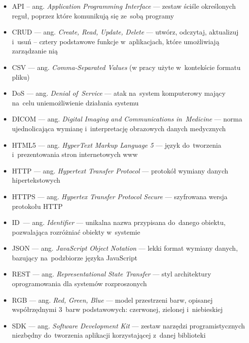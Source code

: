\documentclass[a4paper,11pt,twoside,openright]{report}
\theoremstyle{definition}
\begin{document}
\begin{itemize}[noitemsep]
\item API -- ang. \textit{Application Programming Interface} --- zestaw ściśle określonych reguł, poprzez które komunikują się ze~sobą programy\\
\item CRUD --- ang. \textit{Create, Read, Update, Delete} --- utwórz, odczytaj, aktualizuj i~usuń -- cztery podstawowe funkcje w~aplikacjach, które umożliwiają zarządzanie nią\\
\item CSV --- ang. \textit{Comma-Separated Values} (w pracy użyte w~kontekście formatu pliku) \\
\item DoS --- ang. \textit{Denial of~Service} --- atak na~system komputerowy mający na~celu uniemożliwienie działania systemu\\
\item DICOM --- ang. \textit{Digital Imaging and Communications in~Medicine} --- norma ujednolicająca wymianę i~interpretację obrazowych danych medycznych\\
\item HTML5 --- ang. \textit{HyperText Markup Language 5} --- język do~tworzenia i~prezentowania stron internetowych www\\
\item HTTP --- ang. \textit{Hypertext Transfer Protocol} --- protokół wymiany danych hipertekstowych\\
\item HTTPS --- ang. \textit{Hypertex Transfer Protocol Secure} --- szyfrowana wersja protokołu HTTP\\
\item ID~--- ang. \textit{Identifier} --- unikalna nazwa przypisana do~danego obiektu, pozwalająca rozróżniać obiekty w~systemie\\
\item JSON --- ang. \textit{JavaScript Object Notation} --- lekki format wymiany danych, bazujący na~podzbiorze języka JavaScript\\
\item REST --- ang. \textit{Representational State Transfer} --- styl architektury oprogramowania dla systemów rozproszonych\\
\item RGB --- ang. \textit{Red, Green, Blue} --- model przestrzeni barw, opisanej współrzędnymi 3~barw podstawowych: czerwonej, zielonej i~niebieskiej\\
\item SDK --- ang. \textit{Software Development Kit} --- zestaw narzędzi programistycznych niezbędny do~tworzenia aplikacji korzystającej z~danej biblioteki\\
\end{itemize}
\end{document}
